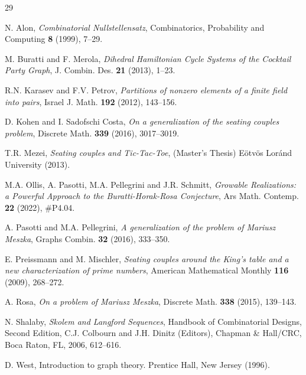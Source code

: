 \documentclass{amsart}
\theoremstyle{definition}
\numberwithin{equation}{section}
\begin{document}
\begin{thebibliography}{29}

 N. Alon,
\emph{Combinatorial Nullstellensatz},
Combinatorics, Probability and Computing \textbf{8} (1999), 7--29.

 M. Buratti and F. Merola,
\emph{Dihedral Hamiltonian Cycle Systems of the Cocktail Party Graph},
J. Combin. Des. \textbf{21} (2013), 1--23.

 R.N. Karasev and F.V. Petrov,
\emph{Partitions of nonzero elements of a finite field into pairs},
Israel J. Math.  \textbf{192} (2012), 143--156.

 D. Kohen and I. Sadofschi Costa,
\emph{On a generalization of the seating couples problem},
Discrete Math. \textbf{339} (2016), 3017--3019.

 T.R. Mezei, \emph{Seating couples and Tic-Tac-Toe},
(Master's Thesis) E\"otv\"os Lor\'and University (2013).

 M.A. Ollis, A. Pasotti, M.A. Pellegrini and J.R. Schmitt,
\emph{Growable Realizations: a Powerful Approach to the Buratti-Horak-Rosa Conjecture},
Ars Math. Contemp. \textbf{22} (2022), \#P4.04.

 A. Pasotti and M.A. Pellegrini,
\emph{A generalization of the problem of Mariusz Meszka},
Graphs Combin. \textbf{32} (2016), 333--350.

 E. Preissmann and M. Mischler,
\emph{Seating couples around the King's table and a new characterization of prime numbers},
American Mathematical Monthly \textbf{116} (2009), 268--272.

 A. Rosa,
\emph{On a problem of Mariusz Meszka},
Discrete Math. \textbf{338} (2015), 139--143.

 N. Shalaby,
\emph{Skolem and Langford Sequences},
Handbook of Combinatorial Designs, Second Edition,  C.J. Colbourn and J.H. Dinitz (Editors),
Chapman \& Hall/CRC, Boca Raton, FL, 2006, 612--616.

 D. West,
Introduction to graph theory.
Prentice Hall, New Jersey (1996).

\end{thebibliography}
\end{document}

